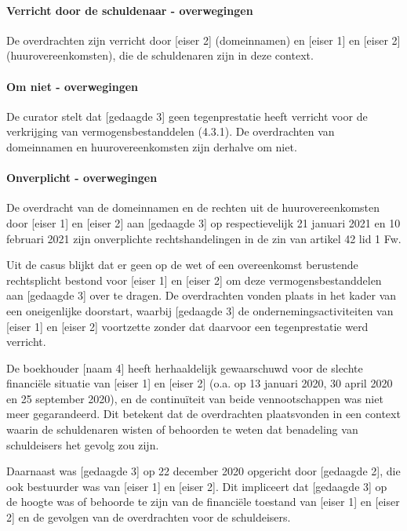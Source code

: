 \documentclass[
  dutch,
  a4paper,
]{article}
\begin{document}
\paragraph{Verricht door de schuldenaar - overwegingen}\label{verricht-door-de-schuldenaar---overwegingen-21}

De overdrachten zijn verricht door {[}eiser 2{]} (domeinnamen) en {[}eiser 1{]} en {[}eiser 2{]} (huurovereenkomsten), die de schuldenaren zijn in deze context.

\paragraph{Om niet - overwegingen}\label{om-niet---overwegingen-21}

De curator stelt dat {[}gedaagde 3{]} geen tegenprestatie heeft verricht voor de verkrijging van vermogensbestanddelen (4.3.1). De overdrachten van domeinnamen en huurovereenkomsten zijn derhalve om niet.

\paragraph{Onverplicht - overwegingen}\label{onverplicht---overwegingen-21}

De overdracht van de domeinnamen en de rechten uit de huurovereenkomsten door {[}eiser 1{]} en {[}eiser 2{]} aan {[}gedaagde 3{]} op respectievelijk 21 januari 2021 en 10 februari 2021 zijn onverplichte rechtshandelingen in de zin van artikel 42 lid 1 Fw.

Uit de casus blijkt dat er geen op de wet of een overeenkomst berustende rechtsplicht bestond voor {[}eiser 1{]} en {[}eiser 2{]} om deze vermogensbestanddelen aan {[}gedaagde 3{]} over te dragen. De overdrachten vonden plaats in het kader van een oneigenlijke doorstart, waarbij {[}gedaagde 3{]} de ondernemingsactiviteiten van {[}eiser 1{]} en {[}eiser 2{]} voortzette zonder dat daarvoor een tegenprestatie werd verricht.

De boekhouder {[}naam 4{]} heeft herhaaldelijk gewaarschuwd voor de slechte financiële situatie van {[}eiser 1{]} en {[}eiser 2{]} (o.a. op 13 januari 2020, 30 april 2020 en 25 september 2020), en de continuïteit van beide vennootschappen was niet meer gegarandeerd. Dit betekent dat de overdrachten plaatsvonden in een context waarin de schuldenaren wisten of behoorden te weten dat benadeling van schuldeisers het gevolg zou zijn.

Daarnaast was {[}gedaagde 3{]} op 22 december 2020 opgericht door {[}gedaagde 2{]}, die ook bestuurder was van {[}eiser 1{]} en {[}eiser 2{]}. Dit impliceert dat {[}gedaagde 3{]} op de hoogte was of behoorde te zijn van de financiële toestand van {[}eiser 1{]} en {[}eiser 2{]} en de gevolgen van de overdrachten voor de schuldeisers.
\end{document}
